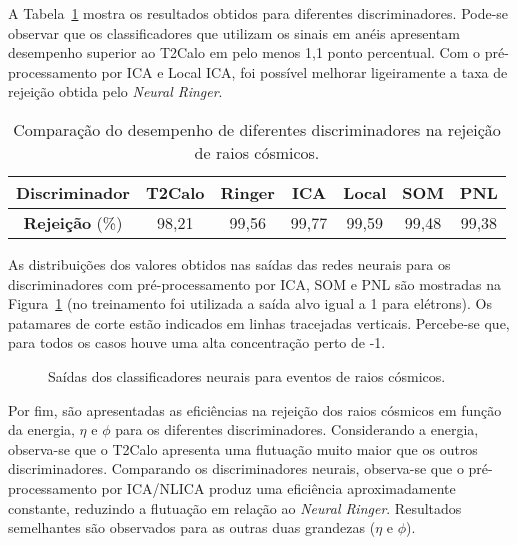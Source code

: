 A Tabela~\ref{tab_cosmicRes} mostra os resultados obtidos para diferentes discriminadores.
Pode-se observar que os classificadores que utilizam os sinais em anéis apresentam
desempenho superior ao T2Calo em pelo menos 1,1 ponto percentual. Com o pré-processamento
por ICA e Local ICA, foi possível melhorar ligeiramente a taxa de rejeição obtida pelo
\emph{Neural Ringer}.

\begin{table}[h]
\centering \caption{Comparação do desempenho de diferentes discriminadores
na rejeição de raios cósmicos.}\vspace{0.2cm} \footnotesize
\begin{tabular}{c| c c c c c c }
    \hline
     \textbf{Discriminador} & \textbf{T2Calo} &  \textbf{Ringer} & \textbf{ICA} & \textbf{Local}&  \textbf{SOM} &  \textbf{PNL}\\
     \hline
    \textbf{Rejeição} (\%) & 98,21 & 99,56  & 99,77 & 99,59 & 99,48 & 99,38\\
\hline
\end{tabular}
\label{tab_cosmicRes}
\end{table}

As distribuições dos valores obtidos nas saídas das redes neurais para os discriminadores
com pré-processamento por ICA, SOM e PNL são mostradas na Figura~\ref{figcosmicNNo} (no
treinamento foi utilizada a saída alvo igual a 1 para elétrons). Os patamares de corte estão indicados
em linhas tracejadas verticais. Percebe-se que, para todos os casos houve uma alta concentração perto de -1.


\begin{figure}[h!]
\begin{minipage}[b]{0.98\linewidth}
  \centering
 \centerline{}
\end{minipage}
\caption{Saídas dos classificadores neurais para eventos de raios cósmicos.}\label{figcosmicNNo}
\end{figure}

Por fim, são apresentadas as eficiências na rejeição dos raios
cósmicos em função da energia, $\eta$ e $\phi$ para os diferentes
discriminadores. Considerando a energia, observa-se que o T2Calo
apresenta uma flutuação muito maior que os outros discriminadores.
Comparando os discriminadores neurais, observa-se que o pré-processamento
por ICA/NLICA produz uma eficiência aproximadamente constante, reduzindo a
flutuação em relação ao \emph{Neural Ringer}. Resultados semelhantes são
observados para as outras duas grandezas ($\eta$ e $\phi$).

